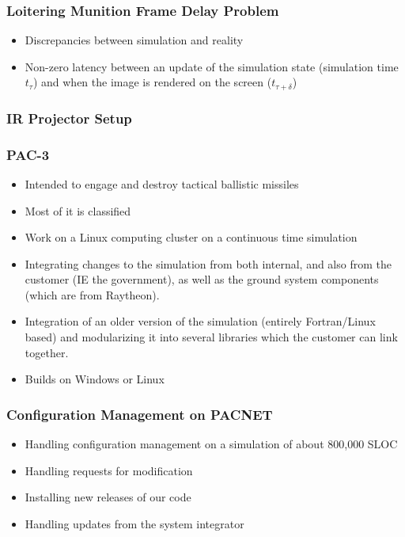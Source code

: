\documentclass[aspectratio=169]{beamer}
\begin{document}
\begin{frame}
  \frametitle{Loitering Munition Frame Delay Problem}
  \begin{itemize}
  \item Discrepancies between simulation and reality
  \item Non-zero latency between an update of the simulation state (simulation time $t_{\tau}$) and when the image is rendered on the screen ($t_{\tau+\delta}$)
  \end{itemize}
\end{frame}

\begin{frame}
  \frametitle{IR Projector Setup}

\end{frame}

\begin{frame}
  \frametitle{PAC-3} %
  \begin{itemize}
  \item Intended to engage and destroy tactical ballistic missiles
  \item Most of it is classified
  \item Work on a Linux computing cluster on a continuous time simulation
  \item Integrating changes to the simulation from both internal, and also from the customer (IE the government), as well as the ground system components (which are from Raytheon).
  \item Integration of an older version of the simulation (entirely Fortran/Linux based) and modularizing it into several libraries which the customer can link together.  
  \item Builds on Windows or Linux
  \end{itemize}
\end{frame}


\begin{frame}
  \frametitle{Configuration Management on PACNET}
  \begin{itemize}
  \item Handling configuration management on a simulation of about 800,000 SLOC
  \item Handling requests for modification
  \item Installing new releases of our code
  \item Handling updates from the system integrator
  \end{itemize}
\end{frame}
\end{document}
